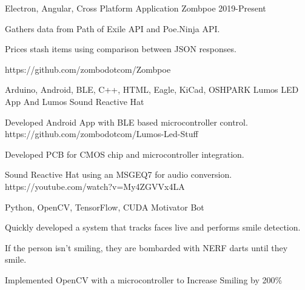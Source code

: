\vspace{-.5\baselineskip}
\begin{cventries}
  \cventry
    {Electron, Angular, Cross Platform Application}
    {Zombpoe}
    {2019-Present}
    {}
    {
      \begin{cvitems}
        \item {Gathers data from Path of Exile API and Poe.Ninja API.}
        \item {Prices stash items using comparison between JSON responses.}
        \item {https://github.com/zombodotcom/Zombpoe}
      \end{cvitems}
    }
  \cventry
    {Arduino, Android, BLE, C++, HTML, Eagle, KiCad, OSHPARK}
    {Lumos LED App And Lumos Sound Reactive Hat}
    {}
    {}
    {
      \begin{cvitems}
        \item {Developed Android App with BLE based microcontroller control. https://github.com/zombodotcom/Lumos-Led-Stuff}
        \item{Developed PCB for CMOS chip and microcontroller integration.}
        \item {Sound Reactive Hat using an MSGEQ7 for audio conversion. https://youtube.com/watch?v=My4ZGVVx4LA}
      \end{cvitems}
    }
  \cventry
    {Python, OpenCV, TensorFlow, CUDA}
    {Motivator Bot}
    {}
    {}
    {
      \begin{cvitems}
        \item {Quickly developed a system that tracks faces live and performs smile detection.}
        \item {If the person isn't smiling, they are bombarded with NERF darts until they smile.}
         \item {Implemented OpenCV with a microcontroller to Increase Smiling by 200\%}
      \end{cvitems}
    }
    \vspace{-1.5\baselineskip}
\end{cventries}